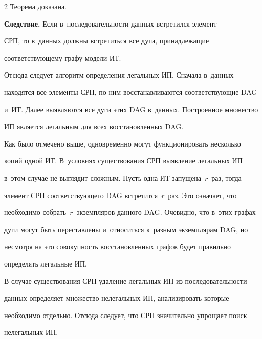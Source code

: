 \begin{multicols}{2}
Теорема доказана.


  


  \smallskip


  


  \noindent


  \textbf{Следствие.} Если в~последовательности данных встретился элемент 


СРП, то в~данных должны встретиться все дуги, принадлежащие 


соответствующему графу модели ИТ. 


  


  Отсюда следует алгоритм определения легальных ИП. Сначала в~данных 


находятся все элементы СРП, по ним восстанавливаются соответствующие DAG 


и~ИТ. Далее выявляются все дуги этих DAG в~данных. Построенное множество 


ИП является легальным для всех восстановленных DAG. 


  


  Как было отмечено выше, одновременно могут функционировать несколько 


копий одной ИТ. В~условиях существования СРП выявление легальных ИП 


в~этом случае не выглядит сложным. Пусть одна ИТ запущена~$r$~раз, тогда 


элемент СРП соответствующего DAG встретится~$r$~раз. Это означает, что 


необходимо собрать~$r$~экземпляров данного DAG. Очевидно, что в~этих графах 


дуги могут быть переставлены и~относиться к~разным экземплярам DAG, но 


несмотря на это совокупность вос\-ста\-нов\-лен\-ных графов будет правильно 


определять легальные ИП. 


  


  В случае существования СРП удаление легальных ИП из последовательности 


данных определяет множество нелегальных ИП, анализировать которые 


необходимо отдельно. Отсюда следует, что СРП значительно упрощает поиск 


нелегальных ИП. 



\end{multicols}
